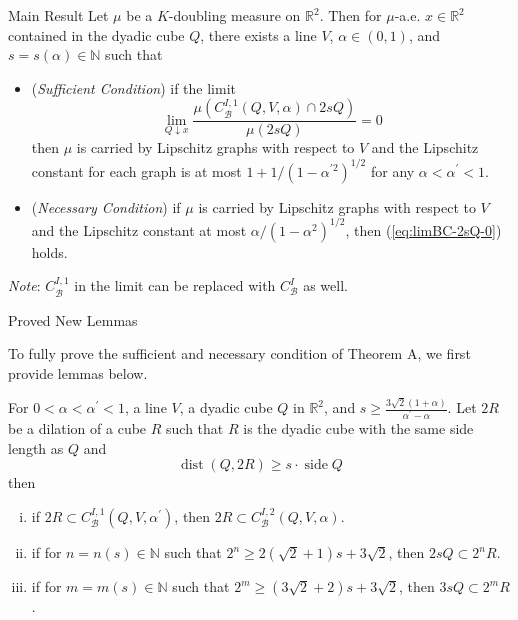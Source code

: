 \documentclass[final]{beamer}
\newlength{\colwidth}
\newcommand{\rr}{\mathbb R}
\newcommand{\nn}{\mathbb N}
\newcommand{\calB}{\mathcal B}
\newcommand{\dist}{\operatorname{dist}}
\newcommand{\side}{\operatorname{side}}
\begin{document}
\begin{frame}[t]
\begin{columns}[t]
\begin{column}{\colwidth}
  \begin{block}{Main Result}
    \label{thmA}
    Let $\mu$ be a $K$-doubling measure on $\rr^2$. Then for $\mu$-a.e. $x\in\rr^2$ contained in the dyadic cube $Q$, there exists a line $V$, $\alpha\in(0,1)$, and $s = s(\alpha)\in\nn$ such that 
    \begin{itemize}
        \item (\textit{Sufficient Condition}) if the limit
        \begin{equation}\label{eq:limBC-2sQ-0}
            \lim_{Q\downarrow x}\frac{\mu(C_\calB^{I,1}(Q, V, \alpha)\cap 2sQ)}{\mu(2sQ)} = 0
        \end{equation}
        then $\mu$ is carried by Lipschitz graphs with respect to $V$ and the Lipschitz constant for each graph is at most $1+1/(1-\alpha^{\prime2})^{1/2}$ for any $\alpha < \alpha^\prime<1$.
        
        \item (\textit{Necessary Condition}) if $\mu$ is carried by Lipschitz graphs with respect to $V$ and the Lipschitz constant at most $\alpha/(1-\alpha^2)^{1/2}$, then (\ref{eq:limBC-2sQ-0}) holds.
    \end{itemize}
    
    
    \textit{Note}: $C_\calB^{I,1}$ in the limit can be replaced with $C_\calB^I$ as well.
    
  \end{block}
\begin{block}{Proved New Lemmas}

    To fully prove the sufficient and necessary condition of Theorem {\color{violet}A}, we first provide lemmas below.
    
    
        For $0<\alpha<\alpha^\prime<1$, a line $V$, a dyadic cube $Q$ in $\rr^2$, and $s\geq \frac{3\sqrt{2}(1+\alpha)}{\alpha^\prime-\alpha}$. Let $2R$ be a dilation of a cube $R$ such that $R$ is the dyadic cube with the same side length as $Q$ and
    \begin{equation*}
        \dist(Q, 2R)\geq s\cdot \side Q
    \end{equation*}
    then
    \begin{enumerate}[(i)]
        \item \label{lemma-1:s-guarantee-containQ-between-2alpha} if $2R\subset C_\calB^{I,1}(Q, V, \alpha^\prime)$, then $2R\subset  C_\calB^{I,2}(Q, V, \alpha)$.
        \item \label{lemma-2:s-guarantee-containQ-between-2alpha} if for $n = n(s) \in \nn$ such that $2^n\geq 2(\sqrt{2}+1)s + 3\sqrt{2}$, then $2sQ\subset 2^n R $.
        \item \label{lemma-3:s-guarantee-containQ-between-2alpha} if for $m = m(s) \in \nn$ such that $2^m \geq (3\sqrt{2}+2)s + 3\sqrt{2}$, then $3sQ\subset 2^m R$. 
    \end{enumerate}
    

\end{block}
\end{column}
\end{columns}
\end{frame}
\end{document}
